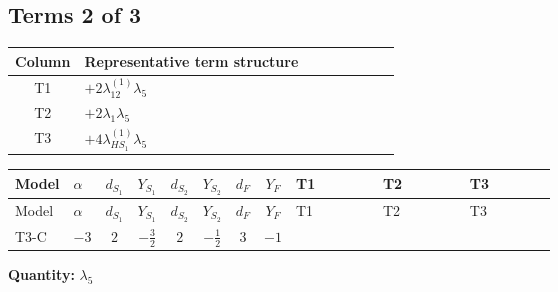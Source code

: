 \documentclass[8pt]{article}
\begin{document}
\begin{landscape}
\subsection*{Terms 2 of 3}
\begin{center}
\begin{tabular}{@{}c >{\raggedright\arraybackslash}p{0.82\linewidth}@{}}
\toprule
Column & Representative term structure \\
\midrule
T1 & \(\displaystyle +2 {\lambda_{12}^{(1)}} {\lambda_5}\) \\
\midrule
T2 & \(\displaystyle +2 {\lambda_1} {\lambda_5}\) \\
\midrule
T3 & \(\displaystyle +4 {\lambda_{HS_1}^{(1)}} {\lambda_5}\) \\
\midrule
\bottomrule
\end{tabular}
\end{center}
\smallskip
\tiny
\begin{longtable}{@{}llcccccc >{\raggedright\arraybackslash}p{0.21\linewidth} >{\raggedright\arraybackslash}p{0.21\linewidth} >{\raggedright\arraybackslash}p{0.21\linewidth}@{}}
\toprule
Model & $\alpha$ & $d_{S_1}$ & $Y_{S_1}$ & $d_{S_2}$ & $Y_{S_2}$ & $d_F$ & $Y_F$ & T1 & T2 & T3 \\
\midrule
\endfirsthead
\toprule
Model & $\alpha$ & $d_{S_1}$ & $Y_{S_1}$ & $d_{S_2}$ & $Y_{S_2}$ & $d_F$ & $Y_F$ & T1 & T2 & T3 \\
\midrule
\endhead
T3-C & $-3$ & $2$ & $-\frac{3}{2}$ & $2$ & $-\frac{1}{2}$ & $3$ & $-1$ & \scriptsize\adjustbox{max width=\linewidth}{$\begin{gathered} +2 {\lambda_{12}^{(1)}} {\lambda_5}\end{gathered}$} & \scriptsize\adjustbox{max width=\linewidth}{$\begin{gathered} +2 {\lambda_1} {\lambda_5}\end{gathered}$} & \scriptsize\adjustbox{max width=\linewidth}{$\begin{gathered} +4 {\lambda_{HS_1}^{(1)}} {\lambda_5}\end{gathered}$} \\
\midrule
\bottomrule
\end{longtable}
\clearpage
\noindent\textbf{Quantity: }$\lambda_5$\par\smallskip

\end{landscape}
\end{document}
